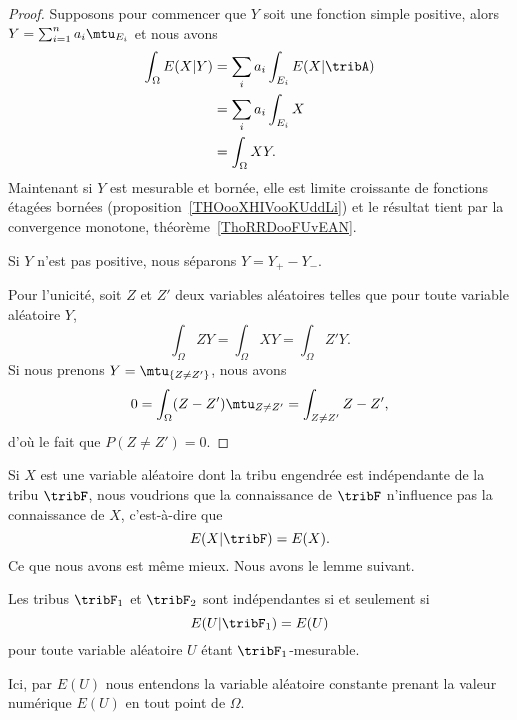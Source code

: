 \begin{proof}
    Supposons pour commencer que \( Y\) soit une fonction simple positive, alors \( Y=\sum_{i=1}^na_i\mtu_{E_i}\) et nous avons
    \begin{subequations}
        \begin{align}
            \int_{\Omega}E(X|Y)&=\sum_{i}a_i\int_{E_i}E(X|\tribA)\\
            &=\sum_ia_i\int_{E_i}X\\
            &=\int_{\Omega}XY.
        \end{align}
    \end{subequations}
    Maintenant si \( Y\) est mesurable et bornée, elle est limite croissante de fonctions étagées bornées (proposition~\ref{THOooXHIVooKUddLi}) et le résultat tient par la convergence monotone, théorème~\ref{ThoRRDooFUvEAN}.

    Si \( Y\) n'est pas positive, nous séparons \( Y=Y_+-Y_-\).

    Pour l'unicité, soit \( Z\) et \( Z'\) deux variables aléatoires telles que pour toute variable aléatoire \( Y\),
    \begin{equation}
        \int_{\Omega}ZY=\int_{\Omega}XY=\int_{\Omega}Z'Y.
    \end{equation}
    Si nous prenons \( Y=\mtu_{\{ Z\neq Z' \}}\), nous avons
    \begin{equation}
        0=\int_{\Omega}(Z-Z')\mtu_{Z\neq Z'}=\int_{Z\neq Z'}Z-Z',
    \end{equation}
    d'où le fait que \( P(Z\neq Z')=0\).
\end{proof}

Si \( X\) est une variable aléatoire dont la tribu engendrée est indépendante de la tribu \( \tribF\), nous voudrions que la connaissance de \( \tribF\) n'influence pas la connaissance de \( X\), c'est-à-dire que
\begin{equation}
    E(X|\tribF)=E(X).
\end{equation}
Ce que nous avons est même mieux. Nous avons le lemme suivant.
\begin{lemma}     \label{LemxUZFPV}
    Les tribus \( \tribF_1\) et \( \tribF_2\) sont indépendantes si et seulement si
    \begin{equation}
        E(U|\tribF_1)=E(U)
    \end{equation}
    pour toute variable aléatoire \( U\) étant \( \tribF_1\)-mesurable.
\end{lemma}
Ici, par \( E(U)\) nous entendons la variable aléatoire constante prenant la valeur numérique \( E(U)\) en tout point de \( \Omega\).


